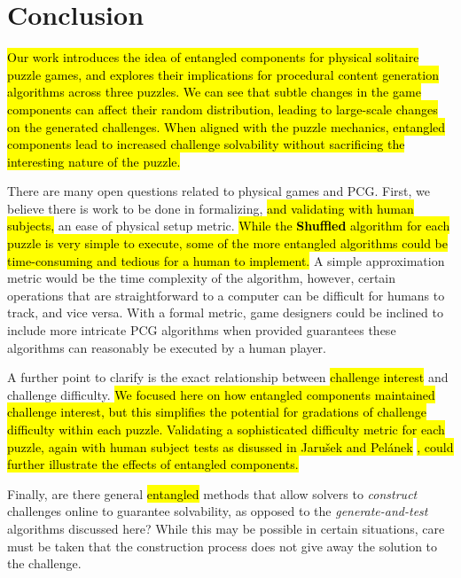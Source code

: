 \documentclass[journal]{IEEEtran}
\begin{document}

\section{Conclusion}   \label{sec:Conclusion}

\noindent
\hl{Our work introduces the idea of entangled components for physical solitaire puzzle games, and explores their implications for procedural content generation algorithms across three puzzles. We can see that subtle changes in the game components can affect their random distribution, leading to large-scale changes on the generated challenges. When aligned with the puzzle mechanics, entangled components lead to increased challenge solvability without sacrificing the interesting nature of the puzzle.}

There are many open questions related to physical games and PCG. First, we believe there is work to be done in formalizing, \hl{and validating with human subjects,} an ease of physical setup metric. \hl{While the \textbf{Shuffled} algorithm for each puzzle is very simple to execute, some of the more entangled algorithms could be time-consuming and tedious for a human to implement.} A simple approximation metric would be the time complexity of the algorithm, however, certain operations that are straightforward to a computer can be difficult for humans to track, and vice versa. With a formal metric, game designers could be inclined to include more intricate PCG algorithms when provided guarantees these algorithms can reasonably be executed by a human player.

A further point to clarify is the exact relationship between \hl{challenge interest} and challenge difficulty. \hl{We focused here on how entangled components maintained challenge interest, but this simplifies the potential for gradations of challenge difficulty within each puzzle. Validating a sophisticated difficulty metric for each puzzle, again with human subject tests as disussed in Jaru{\v{s}}ek and Pel{\'a}nek} \cite{jaruvsek2011determines}
\hl{, could further illustrate the effects of entangled components.}


Finally, are there general \hl{entangled} methods that allow solvers to {\it construct} challenges online to guarantee solvability, as opposed to the {\it generate-and-test} algorithms discussed here? While this may be possible in certain situations, 
care must be taken that the construction process does not give away the solution to the challenge.
\end{document}

